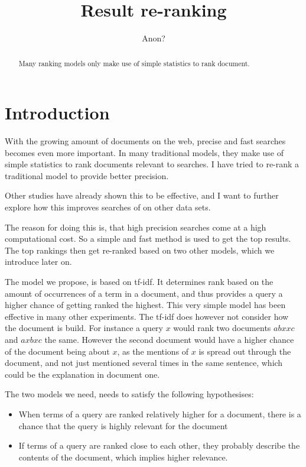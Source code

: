 \documentclass{sig-alternate}
\begin{document}
\title{Result re-ranking}
\author{
\alignauthor 
Anon? %
}
\maketitle

\begin{abstract}
Many ranking models only make use of simple statistics to rank document. 
\end{abstract}
\section{Introduction}
With the growing amount of documents on the web, precise and fast searches becomes even more important. In many traditional models, they make use of simple statistics to rank documents relevant to searches. I have tried to re-rank a traditional model to provide better precision.

Other studies\cite{woo2010achieving} have already shown this to be effective, and I want to further explore how this improves searches of on other data sets.

The reason for doing this is, that high precision searches come at a high computational cost. So a simple and fast method is used to get the top results. The top rankings then get re-ranked based on two other models, which we introduce later on. 

The model we propose, is based on tf-idf. It determines rank based on the amount of occurrences of a term in a document, and thus provides a query a higher chance of getting ranked the highest. This very simple model has been effective in many other experiments. The tf-idf does however not consider how the document is build. For instance a query $x$ would rank two documents $a b x x c$ and $a x b x c$ the same. However the second document would have a higher chance of the document being about $x$, as the mentions of $x$ is spread out through the document, and not just mentioned several times in the same sentence, which could be the explanation in document one.

The two models we need, needs to satisfy the following hypothesises:
\begin{itemize}
\item When terms of a query are ranked relatively higher for a document, there is a chance that the query is highly relevant for the document
\item If terms of a query are ranked close to each other, they probably describe the contents of the document, which implies higher relevance.
\end{itemize}
\end{document}
